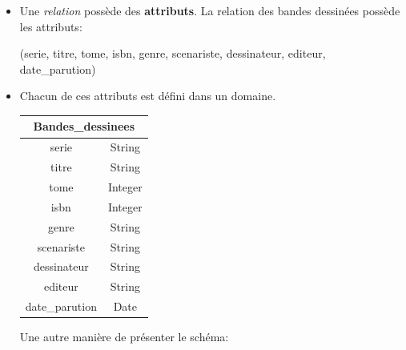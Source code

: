 \documentclass[a4paper,11pt]{article}
\begin{document}
\begin{Form}
\begin{itemize}
\begin{center}
\end{center}
\item Une \emph{relation} possède des \textbf{attributs}. La relation des bandes dessinées possède les attributs:
\begin{center}
(serie, titre, tome, isbn, genre, scenariste, dessinateur, editeur, date\_parution)
\end{center}
\item Chacun de ces attributs est défini dans un domaine.
\begin{center}
\begin{tabular}{|cc|}
\hline 
\multicolumn{2}{|c|}{Bandes\_dessinees} \\ 
\hline 
serie & String \\ 
titre & String \\ 
tome & Integer \\ 
isbn & Integer \\ 
genre & String \\ 
scenariste & String \\ 
dessinateur & String \\ 
editeur & String \\ 
date\_parution & Date \\ 
\hline 
\end{tabular} 
\end{center}
Une autre manière de présenter le schéma:


\end{itemize}
\end{Form}
\end{document}
